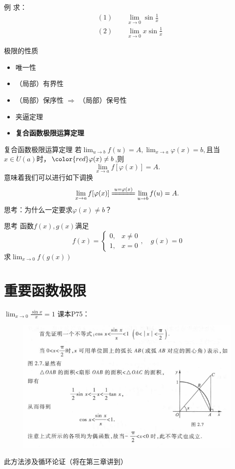 \documentclass[]{beamer}
\begin{document}
\begin{frame}{例}
    求：
    \begin{align*}
        &(1)\qquad \lim_{x\rightarrow0}\sin\frac1x\\
        &(2)\qquad \lim_{x\rightarrow0}x\sin\frac1x
    \end{align*}
\end{frame}

\begin{frame}{极限的性质}
    \begin{itemize}
        \item 唯一性
        \item （局部）有界性
        \item （局部）保序性 $\Rightarrow$ （局部）保号性
        \item 夹逼定理
        \item \textbf{复合函数极限运算定理}
    \end{itemize}
\end{frame}

\begin{frame}{复合函数极限运算定理}
    若$\displaystyle \lim_{u\rightarrow b}f(u)=A,\lim_{x\rightarrow a}\varphi(x)=b,$且当$x\in\dot{U}(a)$时，$\color{red}\varphi(x)\ne b$,则
    \[
    \lim_{x\rightarrow a}f[\varphi(x)]=A.
    \]
    意味着我们可以进行如下调换
    \[
    \lim_{x\rightarrow a}f[\varphi(x)]\xlongequal{u=\varphi(x)}\lim_{u\rightarrow b}f(u)=A.
    \]
    思考：为什么一定要求$\varphi(x)\ne b$？
\end{frame}

\begin{frame}{思考}
    函数$f(x),g(x)$满足
    \[
    f(x)=\left\{
    \begin{array}{ll}
        0, &x\ne0\\
        1, &x = 0
    \end{array}
    \right.,\quad g(x)=0
    \]
    求$\displaystyle\lim_{x\rightarrow0}f(g(x))$
\end{frame}

\section{重要函数极限}

\begin{frame}{$\displaystyle\lim_{x\rightarrow0}\frac{\sin x}{x}=1$}
    课本P75：
    \begin{figure}
        \centering
        \includegraphics[width=0.7\linewidth]{sinxx.png}
    \end{figure}
    此方法涉及循环论证（将在第三章讲到）
\end{frame}
\end{document}
